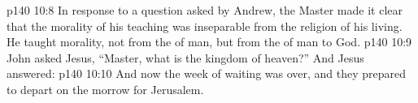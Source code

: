 \vs p140 10:8 In response to a question asked by Andrew, the Master made it clear that the morality of his teaching was inseparable from the religion of his living. He taught morality, not from the  of man, but from the  of man to God.
\vs p140 10:9 \pc John asked Jesus, “Master, what is the kingdom of heaven?” And Jesus answered: 
\vs p140 10:10 \pc And now the week of waiting was over, and they prepared to depart on the morrow for Jerusalem.
\quizlink
